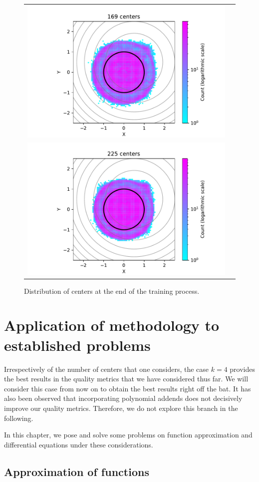 \documentclass[12pt]{report} %
\begin{document}
\begin{figure}[h]
\begin{tabular}{cc}
    \includegraphics[width=.6\textwidth]{imagenes/experiments/2d/pde_parabola/circle_c169_pde_gaussian_kernel.pdf}   \\
    \includegraphics[width=.6\textwidth]{imagenes/experiments/2d/pde_parabola/circle_c225_pde_gaussian_kernel.pdf}
  \end{tabular}
  \caption{Distribution of centers at the end of the training process.}
  \label{fig:2d-pde-results-centers}
\end{figure}

\chapter{Application of methodology to established problems}

Irrespectively of the number of centers that one considers, the case $k=4$ provides the best results in the quality metrics that we have considered thus far. We will consider this case from now on to obtain the best results right off the bat. It has also been observed that incorporating polynomial addends does not decisively improve our quality metrics. Therefore, we do not explore this branch in the following.

In this chapter, we pose and solve some problems on function approximation and differential equations under these considerations.

\section{Approximation of functions}
\end{document}
